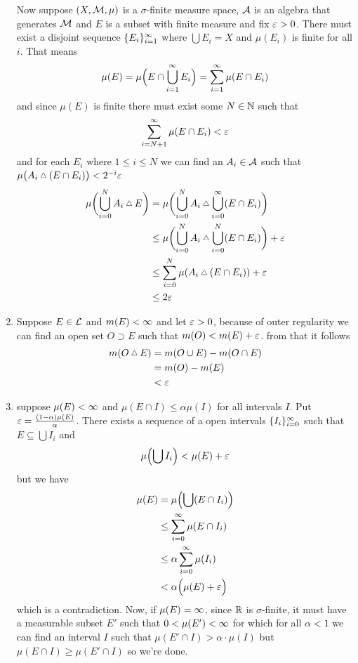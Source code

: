 \documentclass{article}
\begin{document}
\begin{homeworkProblem}
\begin{enumerate}[label=\alph*.]
        Now suppose $(X, \mathcal{M}, \mu)$ is a $\sigma$-finite measure space, $\mathcal{A}$ is an algebra that generates $\mathcal{M}$ and $E$ is a subset with finite measure and fix $\varepsilon>0$. There must exist a disjoint sequence $\{E_i\}_{i=1}^\infty$ where $\bigcup E_i=X$ and $\mu(E_i)$ is finite for all $i$. That means
        \[
            \mu(E)=\mu\Bigl(E \cap \bigcup_{i=1}^\infty E_i\Bigr)=\sum_{i=1}^\infty\mu(E \cap E_i) 
        \]
        and since $\mu(E)$ is finite there must exist some $N\in\mathbb{N}$ such that
        \[
            \sum_{i=N+1}^\infty\mu(E \cap E_i)<\varepsilon
        \]
        and for each $E_i$ where $1\leq i \leq N$ we can find an $A_i \in \mathcal{A}$ such that $\mu\bigl(A_i \symdiff (E \cap E_i)\bigr) < 2^{-i}\eps$
        \begin{align*}
            \mu\biggl(\bigcup_{i=0}^N A_i \symdiff E\biggr) &= \mu\biggl(\bigcup_{i=0}^N A_i \symdiff \bigcup_{i=0}^\i (E \cap E_i) \biggr) \\
            &\leq \mu\biggl(\bigcup_{i=0}^N A_i \symdiff \bigcup_{i=0}^N (E \cap E_i) \biggr) + \eps \\
            &\leq \sum_{i=0}^N \mu(A_i \symdiff (E \cap E_i)) + \eps \\
            &\leq 2\eps
        \end{align*}
        \item Suppose $E \in \mathcal{L}$ and $m(E)<\infty$ and let $\varepsilon>0$, because of outer regularity we can find an open set $O \supset E$ such that $m(O)<m(E)+\varepsilon$. from that it follows
        \begin{align*}
            m(O \symdiff E) &= m(O \cup E) - m(O \cap E) \\
            &= m(O) - m(E) \\
            &< \eps
        \end{align*}
        \item suppose $\mu(E)<\infty$ and $\mu(E \cap I) \leq \alpha \mu(I)$ for all intervals $I$. Put $\varepsilon=\frac{(1-\alpha)\mu(E)}{\alpha}$. There exists a sequence of a open intervals $\{I_i\}_{i=0}^\infty$ such that $E\subseteq \bigcup I_i$ and
        \[
            \mu\Bigl(\bigcup I_i\Bigr)<\mu(E)+\varepsilon
        \]
        but we have
        \begin{align*}
            \mu(E) &= \mu\Bigl(\bigcup (E\cap I_i)\Bigr) \\
            &\leq \sum_{i=0}^\infty \mu(E \cap I_i) \\
            &\leq \alpha \sum_{i=0}^\infty \mu(I_i) \\
            &< \alpha\Big(\mu(E)+\varepsilon\Big)
        \end{align*}
        which is a contradiction. Now, if $\mu(E)=\infty$, since $\mathbb{R}$ is $\sigma$-finite, it must have a measurable subset $E'$ such that $0<\mu(E')<\infty$ for which for all $\alpha<1$ we can find an interval $I$ such that $\mu(E'\cap I)>\alpha\cdot\mu(I)$ but $\mu(E\cap I)\geq \mu(E'\cap I)$ so we're done.
    \end{enumerate}
\end{homeworkProblem}
\end{document}
